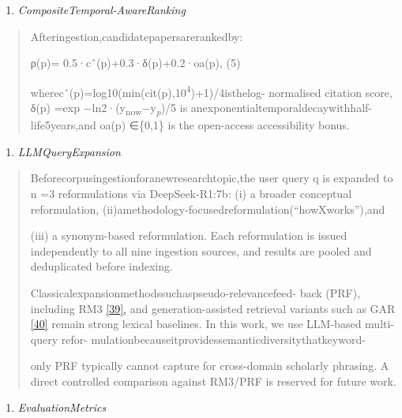 \documentclass[
]{article}
\begin{document}
\begin{enumerate}
\def\labelenumi{\Alph{enumi}.}
\setcounter{enumi}{1}
\item
  \emph{CompositeTemporal-AwareRanking}
\end{enumerate}

\begin{quote}
Afteringestion,candidatepapersarerankedby:

\protect{}\label{_bookmark7}{}ρ(p)= 0.5·cˆ(p)+0.3·δ(p)+0.2·oa(p), (5)

wherecˆ(p)=log10(min(cit(p),10\textsuperscript{4})+1)/4isthelog- normalised citation score, δ(p) =exp −ln2·(y\textsubscript{now}−y\emph{\textsubscript{p}})/5 is anexponentialtemporaldecaywithhalf-life5years,and oa(p) ∈\{0,1\} is the open-access accessibility bonus.
\end{quote}

\begin{enumerate}
\def\labelenumi{\Alph{enumi}.}
\setcounter{enumi}{2}
\item
  \emph{LLMQueryExpansion}
\end{enumerate}

\begin{quote}
Beforecorpusingestionforanewresearchtopic,the user query q is expanded to n =3 reformulations via DeepSeek-R1:7b: (i) a broader conceptual reformulation, (ii)amethodology-focusedreformulation(``howXworks''),and

(iii) a synonym-based reformulation. Each reformulation is issued independently to all nine ingestion sources, and results are pooled and deduplicated before indexing.

Classicalexpansionmethodssuchaspseudo-relevancefeed- back (PRF), including RM3 \hyperref[_bookmark47]{{[}39{]},} and generation-assisted retrieval variants such as GAR \hyperref[_bookmark48]{{[}40{]}} remain strong lexical baselines. In this work, we use LLM-based multi-query refor- mulationbecauseitprovidessemanticdiversitythatkeyword-

only PRF typically cannot capture for cross-domain scholarly phrasing. A direct controlled comparison against RM3/PRF is reserved for future work.
\end{quote}

\begin{enumerate}
\def\labelenumi{\Alph{enumi}.}
\setcounter{enumi}{3}
\item
  \emph{EvaluationMetrics}
\end{enumerate}
\end{document}

